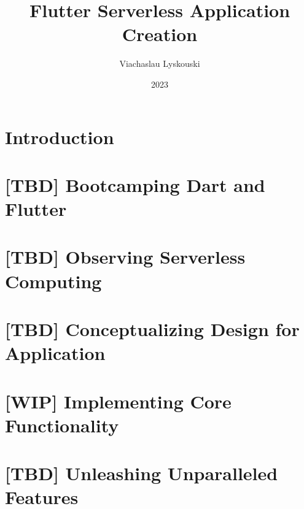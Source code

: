 \documentclass[12pt, a4paper, twoside]{extreport}
\author{Viachaslau Lyskouski}
\title{Flutter Serverless Application Creation}
\date{2023}
\begin{document}


\maketitle

%

\tableofcontents



\section*{Introduction}


\newpage
\section{[TBD] Bootcamping Dart and Flutter}


\newpage
\section{[TBD] Observing Serverless Computing}


\newpage
\section{[TBD] Conceptualizing Design for Application}


\newpage
\section{[WIP] Implementing Core Functionality}







\newpage
\section{[TBD] Unleashing Unparalleled Features}

\end{document}
